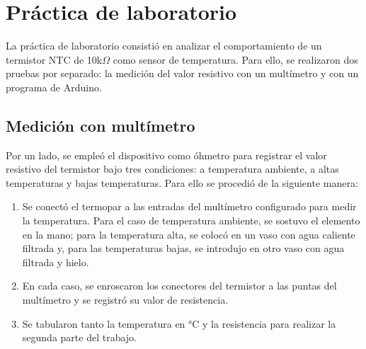 \section{Práctica de laboratorio}

La práctica de laboratorio consistió en analizar el comportamiento de un termistor NTC de 10k$\Omega$ como sensor de temperatura. 
Para ello, se realizaron dos pruebas por separado: la medición del valor resistivo con un multímetro y con un programa de Arduino.
\subsection{Medición con multímetro}
Por un lado, se empleó el dispositivo como óhmetro para registrar el valor resistivo del termistor bajo
tres condiciones: a temperatura ambiente, a altas temperaturas y bajas temperaturas. Para ello se procedió de la siguiente manera:
\begin{enumerate}
    \item Se conectó el termopar a las entradas del multímetro configurado para medir la temperatura. Para el caso de temperatura ambiente, se sostuvo el elemento en la mano; para la temperatura alta, se colocó en un vaso
    con agua caliente filtrada y, para las temperaturas bajas, se introdujo en otro vaso con agua filtrada y hielo.
    \item En cada caso, se enroscaron los conectores del termistor a las puntas del multímetro y se registró su valor de resistencia.
    \item Se tabularon tanto la temperatura en °C y la resistencia para realizar la segunda parte del trabajo.
\end{enumerate}

